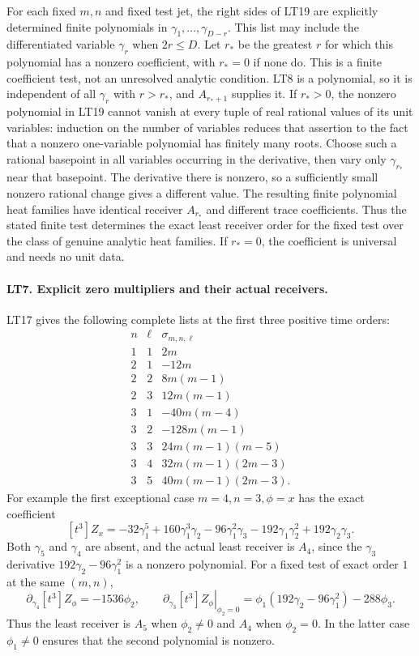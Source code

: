 For each fixed $m,n$ and fixed test jet, the right sides of LT19
are explicitly determined finite polynomials in
$\gamma_1,\ldots,\gamma_{D-r}$. This list may include the
differentiated variable $\gamma_r$ when $2r\le D$.
Let $r_*$ be the greatest $r$ for which this polynomial
has a nonzero coefficient, with $r_*=0$ if none do. This is a
finite coefficient test, not an unresolved analytic condition.
LT8 is a polynomial, so it is independent of all
$\gamma_r$ with $r>r_*$, and $A_{r_*+1}$ supplies it.
If $r_*>0$, the nonzero polynomial in LT19 cannot vanish at
every tuple of real rational values of its unit variables: induction on
the number of variables reduces that assertion to the fact that
a nonzero one-variable polynomial has finitely many roots.
Choose such a rational basepoint in all variables occurring
in the derivative, then vary only $\gamma_{r_*}$ near that
basepoint. The derivative there is nonzero, so a sufficiently
small nonzero rational change gives a different value. The resulting
finite polynomial heat families have identical receiver $A_{r_*}$
and different trace coefficients. Thus the stated finite test
determines the exact least receiver order for the fixed test over
the class of genuine analytic heat families. If $r_*=0$, the
coefficient is universal and needs no unit data.

\paragraph{LT7. Explicit zero multipliers and their actual receivers.}
LT17 gives the following complete lists at the first three
positive time orders:
\[
\begin{array}{c|c|l}
n&\ell&\sigma_{m,n,\ell}\\ \hline
1&1&2m\\
2&1&-12m\\
2&2&8m(m-1)\\
2&3&12m(m-1)\\
3&1&-40m(m-4)\\
3&2&-128m(m-1)\\
3&3&24m(m-1)(m-5)\\
3&4&32m(m-1)(2m-3)\\
3&5&40m(m-1)(2m-3).
\end{array}
\tag{LT20}
\]
For example the first exceptional case $m=4,n=3,\phi=x$ has
the exact coefficient
\[
 [t^3]Z_x=-32\gamma_1^5+160\gamma_1^3\gamma_2
       -96\gamma_1^2\gamma_3-192\gamma_1\gamma_2^2
       +192\gamma_2\gamma_3.
 \tag{LT21}
\]
Both $\gamma_5$ and $\gamma_4$ are absent, and the actual least
receiver is $A_4$, since the $\gamma_3$ derivative
$192\gamma_2-96\gamma_1^2$ is a nonzero polynomial.
For a fixed test of exact order $1$ at the same $(m,n)$,
\[
 \partial_{\gamma_4}[t^3]Z_\phi=-1536\phi_2,\qquad
 \left.\partial_{\gamma_3}[t^3]Z_\phi\right|_{\phi_2=0}
       =\phi_1(192\gamma_2-96\gamma_1^2)-288\phi_3.
 \tag{LT22}
\]
Thus the least receiver is $A_5$ when $\phi_2\ne0$ and $A_4$
when $\phi_2=0$. In the latter case $\phi_1\ne0$ ensures that
the second polynomial is nonzero.

